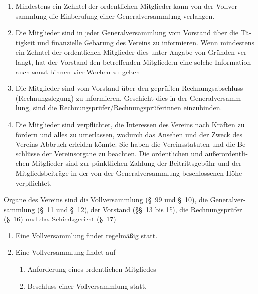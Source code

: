 \begin{otherlanguage}{german}
\begin{enumerate}[statutenenum]
    \item Mindestens ein Zehntel der ordentlichen Mitglieder kann von der Vollversammlung die Einberufung einer Generalversammlung verlangen.

    \item Die Mitglieder sind in jeder Generalversammlung vom Vorstand über die Tätigkeit und finanzielle Gebarung des Vereins zu informieren.
        Wenn mindestens ein Zehntel der ordentlichen Mitglieder dies unter Angabe von Gründen verlangt, hat der Vorstand den betreffenden Mitgliedern eine solche Information auch sonst binnen vier Wochen zu geben.

    \item Die Mitglieder sind vom Vorstand über den geprüften Rechnungsabschluss (Rechnungslegung) zu informieren.
        Geschieht dies in der Generalversammlung, sind die Rechnungsprüfer/Rechnungsprüferinnen einzubinden.

    \item Die Mitglieder sind verpflichtet, die Interessen des Vereins nach Kräften zu fördern und alles zu unterlassen, wodurch das Ansehen und der Zweck des Vereins Abbruch erleiden könnte.
        Sie haben die Vereinsstatuten und die Beschlüsse der Vereinsorgane zu beachten.
        Die ordentlichen und außerordentlichen Mitglieder sind zur pünktlichen Zahlung der Beitrittsgebühr und der Mitgliedsbeiträge in der von der Generalversammlung beschlossenen Höhe verpflichtet.
\end{enumerate}


Organe des Vereins sind die Vollversammlung (\S\ 99 und \S\ 10), die Generalversammlung (\S\ 11 und \S\ 12), der Vorstand (\S\S\ 13 bis 15), die Rechnungsprüfer (\S\ 16) und das Schiedsgericht (\S\ 17).


\begin{enumerate}[statutenenum]
    \item Eine Vollversammlung findet regelmäßig statt.

    \item Eine Vollversammlung findet auf
        \begin{enumerate}[statutenenum]
            \item Anforderung eines ordentlichen Mitgliedes

            \item Beschluss einer Vollversammlung statt.
        \end{enumerate}


\end{enumerate}
\end{otherlanguage}
